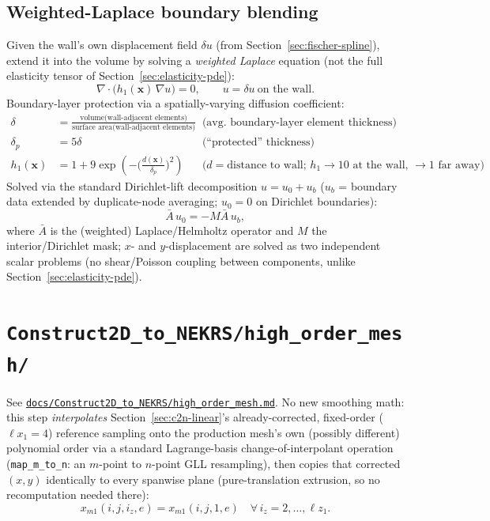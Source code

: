 \documentclass[11pt]{article}
\newcommand{\vecb}[1]{\bm{#1}}
\begin{document}
\subsection{Weighted-Laplace boundary blending}
\label{sec:weighted-laplace}
Given the wall's own displacement field \(\delta u\) (from
Section~\ref{sec:fischer-spline}), extend it into the volume by solving a
\emph{weighted Laplace} equation (not the full elasticity tensor of
Section~\ref{sec:elasticity-pde}):
\begin{equation}
\nabla\cdot\big(h_1(\vecb{x})\,\nabla u\big) = 0, \qquad u = \delta u \ \text{on the wall}.
\end{equation}
Boundary-layer protection via a spatially-varying diffusion coefficient:
\begin{align}
\delta &= \frac{\text{volume(wall-adjacent elements)}}{\text{surface area(wall-adjacent elements)}}
&&\text{(avg. boundary-layer element thickness)}\\
\delta_p &= 5\delta && \text{(``protected'' thickness)} \\
h_1(\vecb{x}) &= 1 + 9\exp\!\left(-\Big(\frac{d(\vecb{x})}{\delta_p}\Big)^{\!2}\right)
&&\text{(} d = \text{distance to wall; } h_1 \to 10 \text{ at the wall, } \to 1 \text{ far away)}
\end{align}
Solved via the standard Dirichlet-lift decomposition \(u = u_0 + u_b\)
(\(u_b\) = boundary data extended by duplicate-node averaging;
\(u_0=0\) on Dirichlet boundaries):
\begin{equation}
\bar A\, u_0 = -M \bar A\, u_b,
\end{equation}
where \(\bar A\) is the (weighted) Laplace/Helmholtz operator and
\(M\) the interior/Dirichlet mask; \(x\)- and \(y\)-displacement are
solved as two independent scalar problems (no shear/Poisson coupling
between components, unlike Section~\ref{sec:elasticity-pde}).

\section{\texttt{Construct2D\_to\_NEKRS/high\_order\_mesh/}}
\label{sec:c2n-high-order}
See \href{https://github.com/kvishalrai/AeroHexMesh/blob/master/docs/Construct2D_to_NEKRS/high_order_mesh.md}{\texttt{docs/Construct2D\_to\_NEKRS/high\_order\_mesh.md}}.
No new smoothing math: this step \emph{interpolates} Section~\ref{sec:c2n-linear}'s
already-corrected, fixed-order (\(\ell x_1=4\)) reference sampling onto
the production mesh's own (possibly different) polynomial order via a
standard Lagrange-basis change-of-interpolant operation
(\texttt{map\_m\_to\_n}: an \(m\)-point to \(n\)-point GLL resampling),
then copies that corrected \((x,y)\) identically to every spanwise
plane (pure-translation extrusion, so no recomputation needed there):
\begin{equation}
x_{m1}(i,j,i_z,e) = x_{m1}(i,j,1,e) \quad \forall\, i_z = 2,\dots,\ell z_1 .
\end{equation}
\end{document}
